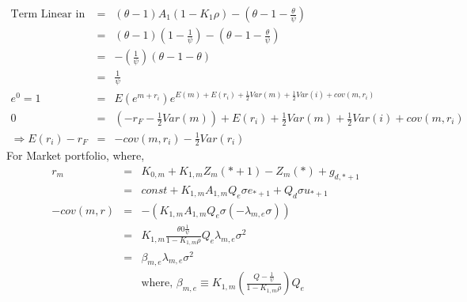 \documentclass[]{article}
\begin{document}
\begin{eqnarray*}
\mbox{Term Linear in X } &=& \left(\theta -1\right) A_1 \left(1-K_1\rho\right)-\left(\theta -1 -\frac{\theta}{\psi}\right)\\
&=& \left(\theta -1\right)\left(1-\frac{1}{\psi}\right) - \left(\theta - 1- \frac{\theta}{\psi}\right)\\
&=&-\left(\frac{1}{\psi}\right) \left(\theta -1 -\theta \right)\\
&=& \frac{1}{\psi}\\
e^0 = 1 &=& E \left(e^{m+r_i}\right) e^{E\left(m\right)+E\left(r_i\right)+\frac{1}{2}Var\left(m\right)+\frac{1}{2}Var\left(i\right)+cov\left(m,r_i\right)}\\
0&=& \left(-r_F - \frac{1}{2} Var\left(m\right)\right)+E\left(r_i\right) + \frac{1}{2}Var\left(m\right)+\frac{1}{2}Var\left(i\right)+cov\left(m,r_i\right)\\
\Rightarrow E \left(r_i\right) - r_F &=& -cov(m,r_i) - \frac{1}{2}Var\left(r_i\right)
\end{eqnarray*}
For Market portfolio, where,
\begin{eqnarray*}
r_m &=& K_{0,m} + K_{1,m} Z_m(*+1) - Z_m(*) + g_{d,*+1}\\
&=& const + K_{1,m} A_{1,m} Q_e \sigma e_{*+1} + Q_d \sigma u_{*+1}\\
-cov\left(m,r\right) &=& -\left(K_{1,m} A_{1,m} Q_e \sigma \left(-\lambda _{m,e} \sigma \right)\right)\\
&=& K_{1,m} \frac{\theta 0 \frac{1}{\psi}}{1-K_{1,m}\rho} Q_e \lambda _{m,e} \sigma ^2\\
&=& \beta _{m,e} \lambda _{m,e} \sigma ^2\\
&& \mbox{where, } \beta _{m,e} \equiv K_{1,m} \left(\frac{Q - \frac{1}{\psi}}{1- K_{1,m}\rho}\right) Q_e
\end{eqnarray*}
\end{document}
